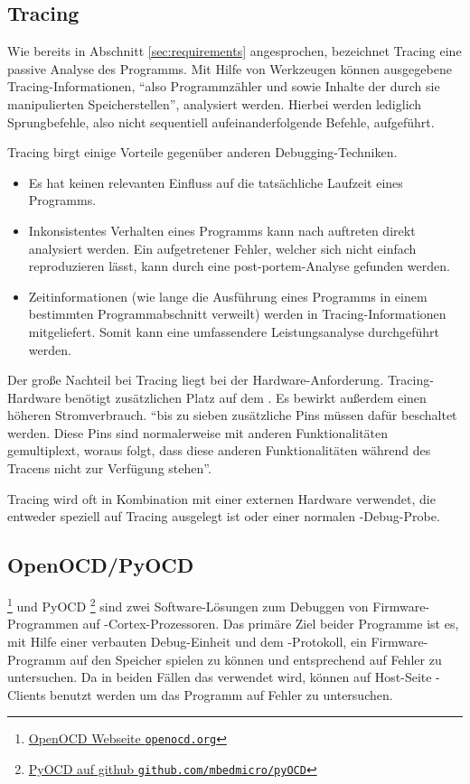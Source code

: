 	\subsection{Tracing}
	\label{sec:trace}
	Wie bereits in Abschnitt \ref{sec:requirements} angesprochen, bezeichnet Tracing eine passive Analyse des Programms.
	Mit Hilfe von Werkzeugen können ausgegebene Tracing\hyp{}Informationen, ``also Programmzähler und sowie Inhalte der durch
	sie manipulierten Speicherstellen''\citep[vgl.~Kap.~10.1.6]{Asche2017}, analysiert werden. Hierbei werden lediglich
	Sprungbefehle, also nicht sequentiell aufeinanderfolgende Befehle, aufgeführt.

	Tracing birgt einige Vorteile gegenüber anderen Debugging-Techniken.

	\begin{itemize}
	    \item Es hat keinen relevanten Einfluss auf die tatsächliche Laufzeit eines Programms.
	    \item Inkonsistentes Verhalten eines Programms kann nach auftreten direkt analysiert werden. Ein aufgetretener
	    Fehler, welcher sich nicht einfach reproduzieren lässt, kann durch eine post-portem-Analyse gefunden werden.
	    \item Zeitinformationen (wie lange die Ausführung eines Programms in einem bestimmten Programmabschnitt verweilt)
	    werden in Tracing-Informationen mitgeliefert. Somit kann eine umfassendere Leistungsanalyse durchgeführt werden.
	\end{itemize}

	Der große Nachteil bei Tracing liegt bei der Hardware-Anforderung. Tracing-Hardware benötigt zusätzlichen Platz auf dem
	. Es bewirkt außerdem einen höheren Stromverbrauch\citep[vgl.~S.~3]{Campbell2014}.
	``bis zu sieben zusätzliche Pins müssen dafür beschaltet werden. Diese Pins sind normalerweise mit anderen
	Funktionalitäten gemultiplext, woraus folgt, dass diese anderen Funktionalitäten während des Tracens nicht zur
	Verfügung stehen''\citep[vgl.~Kap.~10.1.6]{Asche2017}.

	Tracing wird oft in Kombination mit einer externen Hardware verwendet, die entweder speziell auf Tracing ausgelegt
	ist oder einer normalen -Debug-Probe.

	\subsection{OpenOCD/PyOCD}
	\label{sec:openOCD}
	 \footnote{\href{http://openocd.org/}{OpenOCD Webseite \texttt{openocd.org}}}
	und PyOCD \footnote{\href{https://github.com/mbedmicro/pyOCD}{PyOCD auf github \texttt{github.com/mbedmicro/pyOCD}}}
	sind zwei Software-Lösungen zum Debuggen von Firmware\hyp{}Programmen auf -Cortex-Prozessoren.
	Das primäre Ziel beider Programme ist es, mit Hilfe einer
	verbauten Debug-Einheit und dem -Protokoll, ein Firmware-Programm auf den Speicher spielen zu können und
	entsprechend auf Fehler zu untersuchen. Da in beiden Fällen das  verwendet wird, können auf Host-Seite
	-Clients benutzt werden um das Programm auf Fehler zu untersuchen.

